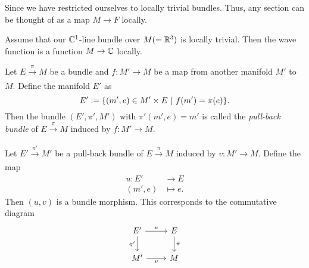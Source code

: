 \begin{remark}
	Since we have restricted ourselves to locally trivial bundles. Thus, any section can be thought of as a map \(M \to F\) locally.
\end{remark}

\begin{example}
	Assume that our \(\mathbb C^1\)-line bundle over \(M (= \mathbb R^3)\) is locally trivial. Then the wave function is a function \(M \to \mathbb C\) locally.
\end{example}

\begin{definition}
	Let \(E \xrightarrow[]{\ \pi\ } M\) be a bundle and \(f: M' \to M\) be a map from another manifold \(M'\) to \(M\). Define the manifold \(E'\) as
	\begin{equation}
		E' := \qty{(m', e) \in M' \times E \ \middle|\ f(m') = \pi(e)}.
	\end{equation}
	Then the bundle \((E', \pi', M')\) with \(\pi'(m', e) = m'\) is called the \emph{pull-back bundle} of \(E \xrightarrow[]{\ \pi\ } M\) induced by \(f: M' \to M\).
\end{definition}

\begin{remark}
	Let \(E' \xrightarrow[]{\ \pi'\ } M'\) be a pull-back bundle of \(E \xrightarrow[]{\ \pi\ } M\) induced by \(v: M' \to M\). Define the map
	\begin{equation}
		\begin{aligned}
			u: E'   & \to E      \\
			(m', e) & \mapsto e.
		\end{aligned}
	\end{equation}
	Then \((u, v)\) is a bundle morphism. This corresponds to the commutative diagram
	\begin{equation}
		\begin{tikzcd}
			E' \arrow[r, "u"] \arrow[d, "\pi'"'] & E \arrow[d, "\pi"] \\
			M' \arrow[r, "v"']                    & M
		\end{tikzcd}
	\end{equation}
\end{remark}

